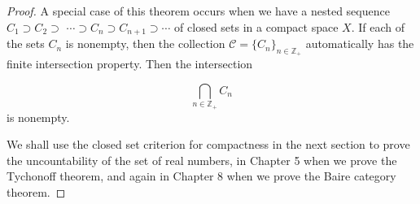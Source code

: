 \begin{proof}
A special case of this theorem occurs when we have a nested sequence \(C_{1} \supset {C}_{2} \supset\) \(\cdots \supset {C}_{n} \supset {C}_{n + 1} \supset \cdots\) of closed sets in a compact space \(X\). If each of the sets \(C_{n}\) is nonempty, then the collection \(\mathcal{C} = {\{ C_{n}\} }_{n \in {\mathbb{Z}}_{ + }}\) automatically has the finite intersection property. Then the intersection

\[
\mathop{\bigcap }\limits_{{n \in {\mathbb{Z}}_{ + }}}C_{n}
\]
is nonempty.

We shall use the closed set criterion for compactness in the next section to prove the uncountability of the set of real numbers, in Chapter 5 when we prove the Tychonoff theorem, and again in Chapter 8 when we prove the Baire category theorem.

\end{proof}
